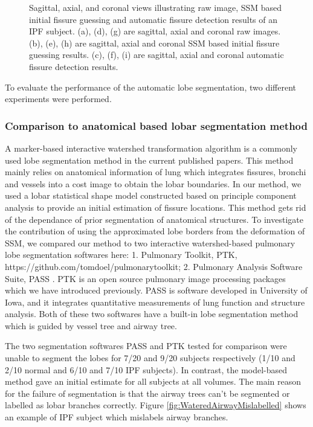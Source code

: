 {\begin{figure}[htbp]
\begin{subfigure}{.32\linewidth}
  \caption{}
  \label{fig:IPFSegmentationResults-i} 
\end{subfigure}
\caption{Sagittal, axial, and coronal views illustrating raw image, SSM based initial fissure guessing and automatic fissure detection results of an IPF subject. (a), (d), (g) are sagittal, axial and coronal raw images. (b), (e), (h) are sagittal, axial and coronal SSM based initial fissure guessing results. (c), (f), (i) are sagittal, axial and coronal automatic fissure detection results.}
\label{fig:IPFSegmentationResults}
\end{figure}

To evaluate the performance of the automatic lobe segmentation, two different experiments were performed.

\subsubsection{Comparison to anatomical based lobar segmentation method}
A marker-based interactive watershed transformation algorithm is a commonly used lobe segmentation method in the current published papers. This method mainly relies on anatomical information of lung which integrates fissures, bronchi and vessels into a cost image to obtain the lobar boundaries. In our method, we used a lobar statistical shape model constructed based on principle component analysis to provide an initial estimation of fissure locations. This method gets rid of the dependance of prior segmentation of anatomical structures. To investigate the contribution of using the approximated lobe borders from the deformation of SSM, we compared our method to two interactive watershed-based pulmonary lobe segmentation softwares here: 1. Pulmonary Toolkit, PTK, https://github.com/tomdoel/pulmonarytoolkit; 2. Pulmonary Analysis Software Suite, PASS \citep{guo2008pulmonary}. PTK is an open source pulmonary image processing packages which we have introduced previously. PASS is software developed in University of Iowa, and it integrates quantitative measurements of lung function and structure analysis. Both of these two softwares have a built-in lobe segmentation method which is guided by vessel tree and airway tree.

The two segmentation softwares PASS and PTK tested for comparison were unable to segment the lobes for 7/20 and 9/20 subjects respectively (1/10 and 2/10 normal and 6/10 and 7/10 IPF subjects). In contrast, the model-based method gave an initial estimate for all subjects at all volumes. The main reason for the failure of segmentation is that the airway trees can't be segmented or labelled as lobar branches correctly. Figure \ref{fig:WateredAirwayMislabelled} shows an example of IPF subject which mislabels airway branches. 

}
